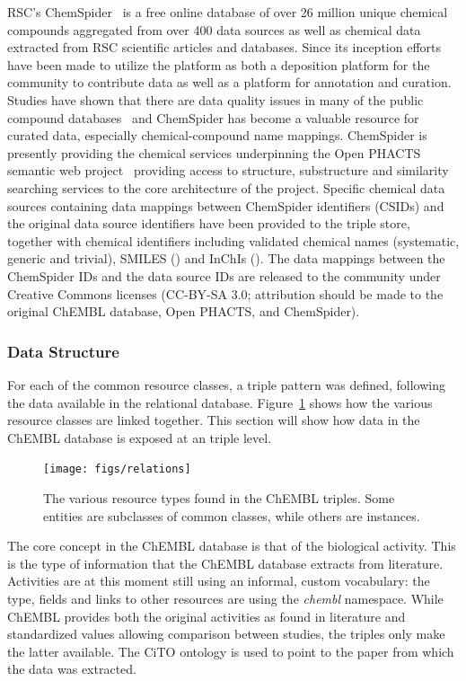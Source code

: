 \documentclass[sw]{iosart2c}
\begin{document}
RSC's ChemSpider~\cite{Pence2010} is a free online database of over 26 million unique
chemical compounds aggregated from over 400 data sources as well as chemical data extracted
from RSC scientific articles and databases. Since its inception efforts have been made to
utilize the platform as both a deposition platform for the community to contribute data as
well as a platform for annotation and curation. Studies have shown that there are data
quality issues in many of the public compound databases~\cite{Williams2011} and ChemSpider has become a
valuable resource for curated data, especially chemical-compound name mappings. ChemSpider
is presently providing the chemical services underpinning the Open PHACTS semantic web
project~\cite{Williams2012} providing access to structure, substructure and similarity searching services
to the core architecture of the project. Specific chemical data sources containing data
mappings between ChemSpider identifiers (CSIDs) and the original data source identifiers
have been provided to the triple store, together with chemical identifiers including
validated chemical names (systematic, generic and trivial), SMILES () and InChIs (). 
The data mappings between the ChemSpider IDs and the data source IDs are released to
the community under Creative Commons licenses (CC-BY-SA 3.0; attribution should be
made to the original ChEMBL database, Open PHACTS, and ChemSpider).

\subsubsection{Data Structure}

For each of the common resource classes, a triple pattern was defined, following the
data available in the relational database. Figure~\ref{f1} shows how the various resource
classes are linked together. This section will show how data in the ChEMBL database
is exposed at an triple level.

\begin{figure}[t]
\texttt{[image: figs/relations]}
\caption{The various resource types found in the ChEMBL triples. Some entities are subclasses
of common classes, while others are instances.}\label{f1}
\end{figure}

The core concept in the ChEMBL database is that of the biological activity. This
is the type of information that the ChEMBL database extracts from literature.
Activities are at this moment still using an informal, custom vocabulary: the
type, fields and links to other resources are using the \textit{chembl}
namespace. While ChEMBL provides both the original activities as found in literature
and standardized values allowing comparison between studies, the triples only
make the latter available. The CiTO ontology is used to point to the paper from
which the data was extracted.
\end{document}
